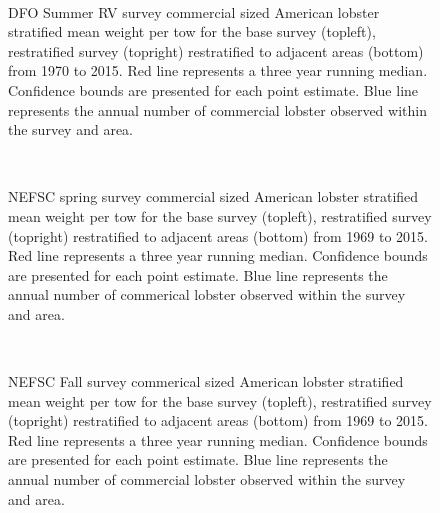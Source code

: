 \documentclass[11pt]{article}
\newcommand{\e}{/backup/bio_data/bio.lobster/figures/} %
\begin{document}
\begin{figure}
\centering
{}
\\
\caption{DFO Summer RV survey commercial sized American lobster stratified mean weight per tow for the base survey (topleft), restratified survey (topright) restratified to adjacent areas (bottom) from 1970 to 2015. Red line represents a three year running median. Confidence bounds are presented for each point estimate. Blue line represents the annual number of commercial lobster observed within the survey and area.}
\end{figure}
\clearpage

\begin{figure}
\centering
{}
\\
\caption{NEFSC spring survey commercial sized American lobster stratified mean weight per tow for the base survey (topleft), restratified survey (topright) restratified to adjacent areas (bottom) from 1969 to 2015. Red line represents a three year running median. Confidence bounds are presented for each point estimate. Blue line represents the annual number of commerical lobster observed within the survey and area.}
\end{figure}
\clearpage


\begin{figure}
\centering
{}
\\
\caption{NEFSC Fall survey commerical sized American lobster stratified mean weight per tow for the base survey (topleft), restratified survey (topright) restratified to adjacent areas (bottom) from 1969 to 2015. Red line represents a three year running median. Confidence bounds are presented for each point estimate. Blue line represents the annual number of commercial lobster observed within the survey and area.}
\end{figure}
\clearpage
\end{document}
